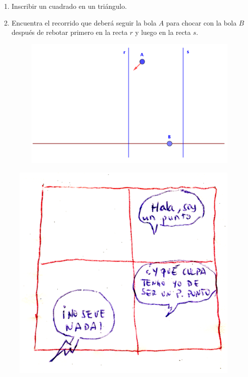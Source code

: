 \begin{enumerate}
\item	Inscribir un cuadrado en un triángulo.

\vspace{-6mm}
\begin{flushright}
\begin{footnotesize} \textcolor{gris}{}	\end{footnotesize}
\end{flushright}

\item	Encuentra el recorrido que deberá seguir la bola $A$ para chocar con la bola $B$ después de rebotar primero en la recta $r$ y luego en la recta $s$.

\begin{figure}[H]
	\centering
	\includegraphics[width=.75\textwidth]{img-ga/ga32.png}
\end{figure}
\vspace{-6mm}
\begin{flushright}
\begin{footnotesize} \textcolor{gris}{}	\end{footnotesize}
\end{flushright}

\end{enumerate}

\vspace{10mm}

\begin{figure}[H]
	\centering
	\includegraphics[width=.6\textwidth]{img-ga/ga30.png}
\end{figure}



